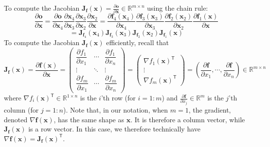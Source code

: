 \documentclass[11pt]{article}
\begin{document}
To compute the Jacobian $\mathbf{J}_{\boldsymbol{f}}(\boldsymbol{x}) = \frac{\partial \boldsymbol{o}}{\partial \boldsymbol{x}} \in \mathbb{R}^{m \times n}$ using the chain rule:
\[
\frac{\partial \boldsymbol{o}}{\partial \boldsymbol{x}} = \frac{\partial \boldsymbol{o}}{\partial \boldsymbol{x}_4} \frac{\partial \boldsymbol{x}_4}{\partial \boldsymbol{x}_3} \frac{\partial \boldsymbol{x}_3}{\partial \boldsymbol{x}_2} \frac{\partial \boldsymbol{x}_2}{\partial \boldsymbol{x}} = \frac{\partial \boldsymbol{f}_4(\boldsymbol{x}_4)}{\partial \boldsymbol{x}_4} \frac{\partial \boldsymbol{f}_3(\boldsymbol{x}_3)}{\partial \boldsymbol{x}_3} \frac{\partial \boldsymbol{f}_2(\boldsymbol{x}_2)}{\partial \boldsymbol{x}_2} \frac{\partial \boldsymbol{f}_1(\boldsymbol{x})}{\partial \boldsymbol{x}}
\]
\[
= \mathbf{J}_{\boldsymbol{f}_4}(\boldsymbol{x}_4) \mathbf{J}_{\boldsymbol{f}_3}(\boldsymbol{x}_3) \mathbf{J}_{\boldsymbol{f}_2}(\boldsymbol{x}_2) \mathbf{J}_{\boldsymbol{f}_1}(\boldsymbol{x})
\]
To compute the Jacobian $\mathbf{J}_{\boldsymbol{f}}(\boldsymbol{x})$ efficiently, recall that
\[
\mathbf{J}_{\boldsymbol{f}}(\boldsymbol{x}) = \frac{\partial \boldsymbol{f}(\boldsymbol{x})}{\partial \boldsymbol{x}} = \begin{pmatrix} \dfrac{\partial f_1}{\partial x_1} & \cdots & \dfrac{\partial f_1}{\partial x_n} \\ \vdots & \ddots & \vdots \\ \dfrac{\partial f_m}{\partial x_1} & \cdots & \dfrac{\partial f_m}{\partial x_n} \end{pmatrix} = \begin{pmatrix} \nabla f_1(\boldsymbol{x})^\mathsf{T} \\ \vdots \\ \nabla f_m(\boldsymbol{x})^\mathsf{T} \end{pmatrix} = \left( \frac{\partial \boldsymbol{f}}{\partial x_1}, \cdots, \frac{\partial \boldsymbol{f}}{\partial x_n} \right) \in \mathbb{R}^{m \times n}
\]
where $\nabla f_i(\boldsymbol{x})^\mathsf{T} \in \mathbb{R}^{1 \times n}$ is the $i$'th row (for $i = 1:m$) and $\frac{\partial \boldsymbol{f}}{\partial x_j} \in \mathbb{R}^m$ is the $j$'th column (for $j = 1:n$). Note that, in our notation, when $m = 1$, the gradient, denoted $\nabla \boldsymbol{f}(\boldsymbol{x})$, has the same shape as $\boldsymbol{x}$. It is therefore a column vector, while $\mathbf{J}_{\boldsymbol{f}}(\boldsymbol{x})$ is a row vector. In this case, we therefore technically have $\nabla \boldsymbol{f}(\boldsymbol{x}) = \mathbf{J}_{\boldsymbol{f}}(\boldsymbol{x})^\mathsf{T}$.
\end{document}
